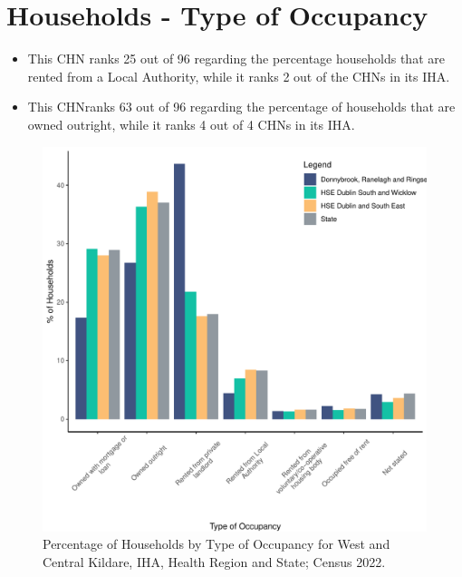 \documentclass{article}
\begin{document}
\section{Households - Type of Occupancy}\label{sect:Households}
\begin{itemize}
\item This CHN ranks  25 out of 96 regarding the percentage households that are rented from a Local Authority, while it ranks  2 out of the CHNs in its IHA. 
\item This CHNranks  63 out of 96 regarding the percentage of households that are owned outright, while it ranks   4 out of 4 CHNs in its IHA.
\end{itemize}
\begin{figure}[H]
	\centering
	\includegraphics[width = 140mm]{../figures/HouseholdsED.pdf}
	\caption{Percentage of Households by Type of Occupancy for West and Central Kildare, IHA, Health Region and State; Census 2022.}
	\label{fig:vbnv}
	\end{figure}
\end{document}
